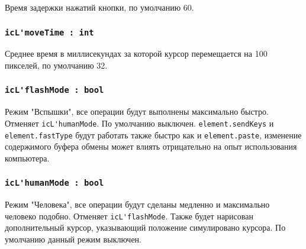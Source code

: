 Время задержки нажатий кнопки, по умолчанию 60.

\subsubsection{\lstinline|icL'moveTime : int|}

Среднее время в миллисекундах за которой курсор перемещается на 100 пикселей, по умолчанию 32.

\subsubsection{\lstinline|icL'flashMode : bool|}

Режим "Вспышки", все операции будут выполнены максимально быстро. Отменяет \lstinline|icL'humanMode|. По умолчанию выключен. \lstinline|element.sendKeys| и \lstinline|element.fastType| будут работать также быстро как и \lstinline|element.paste|, изменение содержимого буфера обмены может влиять отрицательно на опыт использования компьютера.

\subsubsection{\lstinline|icL'humanMode : bool|}

Режим "Человека", все операции будут сделаны медленно и максимально человеко подобно. Отменяет \lstinline|icL'flashMode|. Также будет нарисован дополнительный курсор, указывающий положение симулировано курсора. По умолчанию данный режим выключен.

